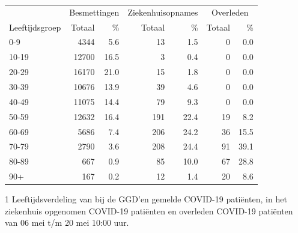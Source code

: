 \documentclass[
  english,
  man,floatsintext]{apa6}
\begin{document}
\begin{table}
\centering\begingroup\fontsize{11}{13}\selectfont

\begin{threeparttable}
\begin{tabular}{lrrrrrr}
\toprule
\multicolumn{1}{c}{ } & \multicolumn{2}{c}{Besmettingen} & \multicolumn{2}{c}{Ziekenhuisopnames} & \multicolumn{2}{c}{Overleden} \\
\cmidrule(l{3pt}r{3pt}){2-3} \cmidrule(l{3pt}r{3pt}){4-5} \cmidrule(l{3pt}r{3pt}){6-7}
Leeftijdsgroep & Totaal & \% & Totaal & \% & Totaal & \%\\
\midrule
0-9 & 4344 & 5.6 & 13 & 1.5 & 0 & 0.0\\
10-19 & 12700 & 16.5 & 3 & 0.4 & 0 & 0.0\\
20-29 & 16170 & 21.0 & 15 & 1.8 & 0 & 0.0\\
30-39 & 10676 & 13.9 & 39 & 4.6 & 0 & 0.0\\
40-49 & 11075 & 14.4 & 79 & 9.3 & 0 & 0.0\\
50-59 & 12632 & 16.4 & 191 & 22.4 & 19 & 8.2\\
60-69 & 5686 & 7.4 & 206 & 24.2 & 36 & 15.5\\
70-79 & 2790 & 3.6 & 208 & 24.4 & 91 & 39.1\\
80-89 & 667 & 0.9 & 85 & 10.0 & 67 & 28.8\\
90+ & 167 & 0.2 & 12 & 1.4 & 20 & 8.6\\
\bottomrule
\end{tabular}
\begin{tablenotes}
\item[1] Leeftijdsverdeling van bij de GGD’en gemelde COVID-19 patiënten, in het ziekenhuis opgenomen COVID-19 patiënten en overleden COVID-19 patiënten van 06 mei t/m 20 mei 10:00 uur.
\end{tablenotes}
\end{threeparttable}
\endgroup{}
\end{table}

\newpage
\end{document}
